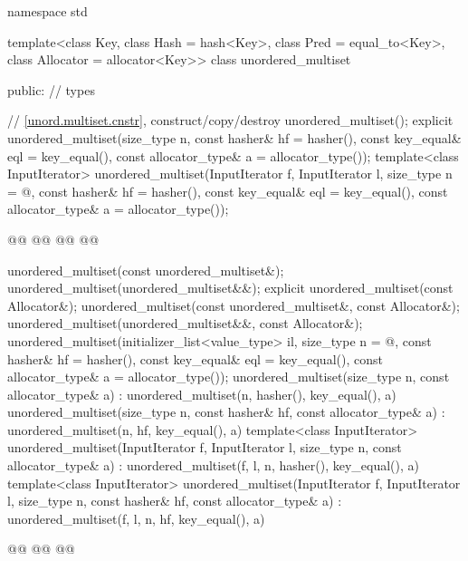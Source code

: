 \documentclass{wg21}
\begin{document}
%
\begin{codeblock}
namespace std {
template<class Key,
class Hash = hash<Key>,
class Pred = equal_to<Key>,
class Allocator = allocator<Key>>
class unordered_multiset {
    public:
    // types

    // \ref{unord.multiset.cnstr}, construct/copy/destroy
    unordered_multiset();
    explicit unordered_multiset(size_type n,
    const hasher& hf = hasher(),
    const key_equal& eql = key_equal(),
    const allocator_type& a = allocator_type());
    template<class InputIterator>
    unordered_multiset(InputIterator f, InputIterator l,
        size_type n = @\seebelow@,
        const hasher& hf = hasher(),
        const key_equal& eql = key_equal(),
        const allocator_type& a = allocator_type());

    @@
    @@
    @@
    @@

    unordered_multiset(const unordered_multiset&);
    unordered_multiset(unordered_multiset&&);
    explicit unordered_multiset(const Allocator&);
    unordered_multiset(const unordered_multiset&, const Allocator&);
    unordered_multiset(unordered_multiset&&, const Allocator&);
    unordered_multiset(initializer_list<value_type> il,
        size_type n = @\seebelow@,
        const hasher& hf = hasher(),
        const key_equal& eql = key_equal(),
        const allocator_type& a = allocator_type());
    unordered_multiset(size_type n, const allocator_type& a)
    : unordered_multiset(n, hasher(), key_equal(), a) { }
    unordered_multiset(size_type n, const hasher& hf, const allocator_type& a)
    : unordered_multiset(n, hf, key_equal(), a) { }
    template<class InputIterator>
    unordered_multiset(InputIterator f, InputIterator l, size_type n, const allocator_type& a)
    : unordered_multiset(f, l, n, hasher(), key_equal(), a) { }
    template<class InputIterator>
    unordered_multiset(InputIterator f, InputIterator l, size_type n, const hasher& hf,
    const allocator_type& a)
    : unordered_multiset(f, l, n, hf, key_equal(), a) { }

    @@
    @@
    @@

}}
\end{codeblock}
\end{document}
